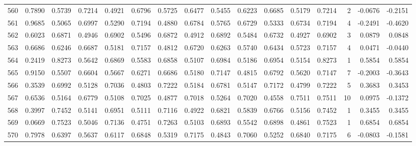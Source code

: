 \begin{tabular}{lrrrrrrrrrrrrrrr}
560 &      0.7890 &  0.5739 &  0.7214 &  0.4921 &  0.6796 &  0.5725 &  0.6477 &  0.5455 &  0.6223 &  0.6685 &   0.5179 &     0.7214 &      2 &                   -0.0676 &                    -0.2151 \\
561 &      0.9685 &  0.5065 &  0.6997 &  0.5290 &  0.7194 &  0.4880 &  0.6784 &  0.5765 &  0.6729 &  0.5333 &   0.6734 &     0.7194 &      4 &                   -0.2491 &                    -0.4620 \\
562 &      0.6023 &  0.6871 &  0.4946 &  0.6902 &  0.5496 &  0.6872 &  0.4912 &  0.6892 &  0.5484 &  0.6732 &   0.4927 &     0.6902 &      3 &                    0.0879 &                     0.0848 \\
563 &      0.6686 &  0.6246 &  0.6687 &  0.5181 &  0.7157 &  0.4812 &  0.6720 &  0.6263 &  0.5740 &  0.6434 &   0.5723 &     0.7157 &      4 &                    0.0471 &                    -0.0440 \\
564 &      0.2419 &  0.8273 &  0.5642 &  0.6869 &  0.5583 &  0.6858 &  0.5107 &  0.6984 &  0.5186 &  0.6954 &   0.5154 &     0.8273 &      1 &                    0.5854 &                     0.5854 \\
565 &      0.9150 &  0.5507 &  0.6604 &  0.5667 &  0.6271 &  0.6686 &  0.5180 &  0.7147 &  0.4815 &  0.6792 &   0.5620 &     0.7147 &      7 &                   -0.2003 &                    -0.3643 \\
566 &      0.3539 &  0.6992 &  0.5128 &  0.7036 &  0.4803 &  0.7222 &  0.5184 &  0.6781 &  0.5147 &  0.7172 &   0.4799 &     0.7222 &      5 &                    0.3683 &                     0.3453 \\
567 &      0.6536 &  0.5164 &  0.6779 &  0.5108 &  0.7025 &  0.4877 &  0.7018 &  0.5264 &  0.7020 &  0.4558 &   0.7511 &     0.7511 &     10 &                    0.0975 &                    -0.1372 \\
568 &      0.3997 &  0.7452 &  0.5141 &  0.6951 &  0.5111 &  0.7116 &  0.4922 &  0.6821 &  0.5839 &  0.6766 &   0.5156 &     0.7452 &      1 &                    0.3455 &                     0.3455 \\
569 &      0.0669 &  0.7523 &  0.5046 &  0.7136 &  0.4751 &  0.7263 &  0.5103 &  0.6893 &  0.5542 &  0.6898 &   0.4861 &     0.7523 &      1 &                    0.6854 &                     0.6854 \\
570 &      0.7978 &  0.6397 &  0.5637 &  0.6117 &  0.6848 &  0.5319 &  0.7175 &  0.4843 &  0.7060 &  0.5252 &   0.6840 &     0.7175 &      6 &                   -0.0803 &                    -0.1581 \\

\end{tabular}
